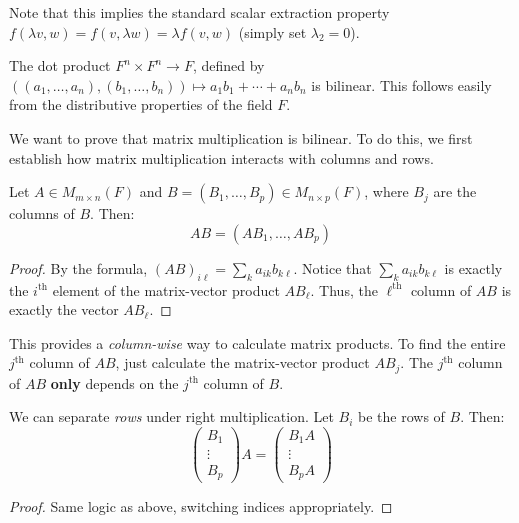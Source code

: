 \documentclass[../linear_algebra_and_groups.tex]{subfiles}
\begin{document}
\begin{remark}
    Note that this implies the standard scalar extraction property $f(\lambda v,w)=f(v,\lambda w)=\lambda f(v,w)$ (simply set $\lambda_2 = 0$). 
\end{remark}

\begin{example}
    The dot product $F^n\times F^n\to F$, defined by $((a_1,\dots,a_n),(b_1,\dots,b_n))\mapsto a_1b_1+\cdots+a_nb_n$ is bilinear. This follows easily from the distributive properties of the field $F$.
\end{example}

We want to prove that matrix multiplication is bilinear. To do this, we first establish how matrix multiplication interacts with columns and rows.

\begin{proposition}
    \begin{shaded*}
        Let $A\in M_{m\times n}(F)$ and $B=(B_1,\dots,B_p)\in M_{n\times p}(F)$, where $B_j$ are the columns of $B$. Then:
        $$AB=(AB_1,\dots,AB_p)$$
    \end{shaded*}
\end{proposition}
\begin{proof}
    By the formula, $(AB)_{i\ell}=\sum_k a_{ik}b_{k\ell}$. 
    Notice that $\sum_k a_{ik}b_{k\ell}$ is exactly the $i^{\mathrm{th}}$ element of the matrix-vector product $AB_\ell$. Thus, the $\ell^{\mathrm{th}}$ column of $AB$ is exactly the vector $AB_\ell$.
    \qedhere
\end{proof}

\begin{remark}
    This provides a \textit{column-wise} way to calculate matrix products. To find the entire $j^{\mathrm{th}}$ column of $AB$, just calculate the matrix-vector product $AB_j$. The $j^{\mathrm{th}}$ column of $AB$ \textbf{only} depends on the $j^{\mathrm{th}}$ column of $B$.
\end{remark}

\begin{proposition}
    \begin{shaded*}
        We can separate \textit{rows} under right multiplication. Let $B_i$ be the rows of $B$. Then:
        $$\begin{pmatrix}B_1\\\vdots\\B_p\end{pmatrix}A=\begin{pmatrix}B_1A\\\vdots\\B_pA\end{pmatrix}$$
    \end{shaded*}
\end{proposition}
\begin{proof}
    Same logic as above, switching indices appropriately.
    \qedhere
\end{proof}
\end{document}
